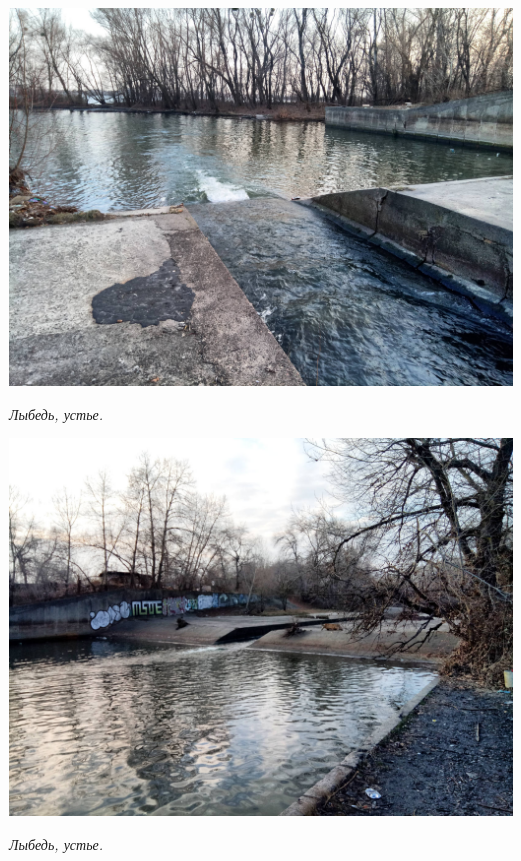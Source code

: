 \begin{center}
\includegraphics[width=\linewidth]{rpix/IMG_20191126_141702_DRO.jpg}

\textit{Лыбедь, устье.}
\end{center}


\begin{center}
\includegraphics[width=\linewidth]{rpix/IMG_20191126_142103_DRO.jpg}

\textit{Лыбедь, устье.}
\end{center}


